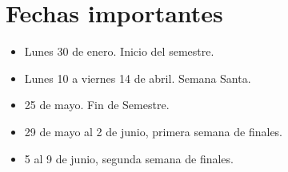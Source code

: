\documentclass[12pt]{article}
\begin{document}
\section{Fechas importantes}
\begin{itemize}
\item Lunes 30 de enero. Inicio del semestre.
\item Lunes 10 a viernes 14 de abril. Semana Santa.
\item 25 de mayo. Fin de Semestre.
\item 29 de mayo al 2 de junio, primera semana de finales.
\item 5 al 9 de junio, segunda semana de finales.
\end{itemize}
\end{document}
